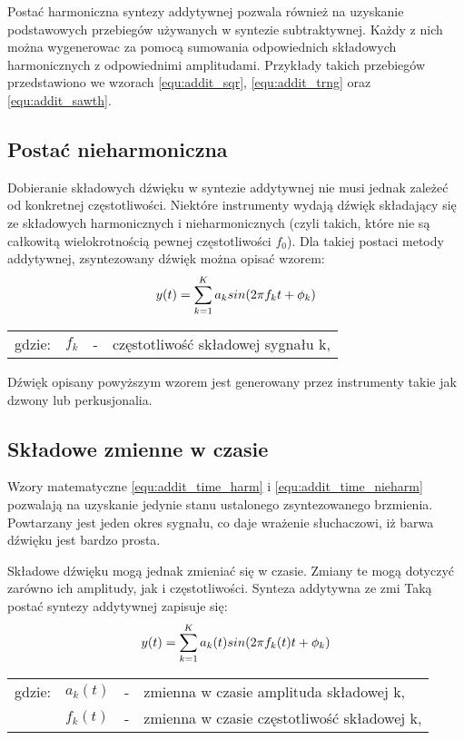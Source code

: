 Postać harmoniczna syntezy addytywnej pozwala również na uzyskanie podstawowych przebiegów używanych w syntezie subtraktywnej. Każdy z nich można wygenerowac za pomocą sumowania odpowiednich składowych harmonicznych z odpowiednimi amplitudami. Przykłady takich przebiegów przedstawiono we wzorach \ref{equ:addit_sqr}, \ref{equ:addit_trng} oraz \ref{equ:addit_sawth}.

\subsection{Postać nieharmoniczna} \label{pos_nieharm}
Dobieranie składowych dźwięku w syntezie addytywnej nie musi jednak zależeć od konkretnej częstotliwości. Niektóre instrumenty wydają dźwięk składający się ze składowych harmonicznych i nieharmonicznych (czyli takich, które nie są całkowitą wielokrotnością pewnej częstotliwości $f_{0}$). Dla takiej postaci metody addytywnej, zsyntezowany dźwięk można opisać wzorem:
\begin{equation} \label{equ:addit_time_nieharm}
y(t) = \sum_{k=1}^{K} a_{k}sin(2\pi f_{k}t + \phi_{k})  \\  
\end{equation}
\begin{tabular}{ l l l l}
	gdzie: 	&	$f_{k}$ & - &  częstotliwość składowej sygnału k,\\
\end{tabular}

Dźwięk opisany powyższym wzorem jest generowany przez instrumenty takie jak dzwony lub perkusjonalia.

\subsection{Składowe zmienne w czasie}
Wzory matematyczne \ref{equ:addit_time_harm} i \ref{equ:addit_time_nieharm} pozwalają na uzyskanie jedynie stanu ustalonego zsyntezowanego brzmienia. Powtarzany jest jeden okres sygnału, co daje wrażenie słuchaczowi, iż barwa dźwięku jest bardzo prosta.

Składowe dźwięku mogą jednak zmieniać się w czasie. Zmiany te mogą dotyczyć zarówno ich amplitudy, jak i częstotliwości. Synteza addytywna ze zmi
Taką postać syntezy addytywnej zapisuje się:
\begin{equation} \label{equ:addit_time_zmienne}
y(t) = \sum_{k=1}^{K} a_{k}(t)sin(2\pi f_{k}(t)t + \phi_{k})  \\  
\end{equation}
\begin{tabular}{ l l l l}
	gdzie: & $a_{k}(t)$ &  - & zmienna w czasie amplituda składowej k, \\
	&	$f_{k}(t)$ & - &  zmienna w czasie częstotliwość składowej k, \\
\end{tabular}

